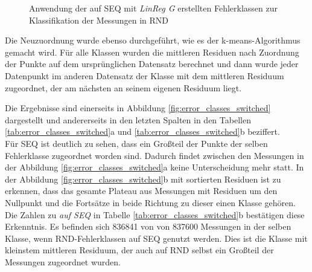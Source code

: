 \documentclass[
	12pt,
	a4paper,
	BCOR10mm,
	DIV14,
	listof=totoc,
	bibliography=totoc,
	headsepline
]{scrreprt}
\begin{document}
\begin{figure}
	\begin{center}
		\caption{Anwendung der auf SEQ mit \textit{LinReg G} erstellten Fehlerklassen zur Klassifikation der Messungen in RND}
		\label{fig:switched_classificators}
	\end{center}
\end{figure} 

Die Neuzuordnung wurde ebenso durchgeführt, wie es der k-means-Algorithmus gemacht wird.
Für alle Klassen wurden die mittleren Residuen nach Zuordnung der Punkte auf dem ursprünglichen Datensatz berechnet und dann wurde jeder Datenpunkt im anderen Datensatz der Klasse mit dem mittleren Residuum zugeordnet, der am nächsten an seinem eigenen Residuum liegt.\medskip

Die Ergebnisse sind einerseits in Abbildung \ref{fig:error_classes_switched} dargestellt und andererseits in den letzten Spalten in den Tabellen \ref{tab:error_classes_switched}a und \ref{tab:error_classes_switched}b beziffert.\\
Für SEQ ist deutlich zu sehen, dass ein Großteil der Punkte der selben Fehlerklasse zugeordnet worden sind. Dadurch findet zwischen den Messungen in der Abbildung \ref{fig:error_classes_switched}a keine Unterscheidung mehr statt.
In der Abbildung \ref{fig:error_classes_switched}b mit sortierten Residuen ist zu erkennen, dass das gesamte Plateau aus Messungen mit Residuen um den Nullpunkt und die Fortsätze in beide Richtung zu dieser einen Klasse gehören.
Die Zahlen zu \textit{auf SEQ} in Tabelle \ref{tab:error_classes_switched}b bestätigen diese Erkenntnis.
Es befinden sich 836841 von von 837600 Messungen in der selben Klasse, wenn RND-Fehlerklassen auf SEQ genutzt werden.
Dies ist die Klasse mit kleinstem mittleren Residuum, der auch auf RND selbst ein Großteil der Messungen zugeordnet wurden.\medskip
\end{document}
